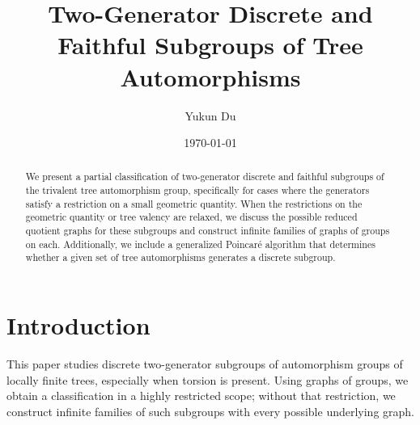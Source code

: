 \documentclass[12pt,leqno]{amsart}
\newcommand{\2}{L^2_{\rm per}(0, T)}
\numberwithin{equation}{section}
\numberwithin{figure}{section}
\begin{document}
\title[Two-Generator Discrete and Faithful Subgroups of Tree Automorphisms]{Two-Generator Discrete and Faithful Subgroups of Tree Automorphisms}


\author{Yukun Du}
\address[Y. Du]{Department of Mathematics, University of Georgia, Athens, GA 30603}


\begin{abstract}
We present a partial classification of two-generator discrete and faithful subgroups of the trivalent tree automorphism group, specifically for cases where the generators satisfy a restriction on a small geometric quantity. When the restrictions on the geometric quantity or tree valency are relaxed, we discuss the possible reduced quotient graphs for these subgroups and construct infinite families of graphs of groups on each. Additionally, we include a generalized Poincar\'e algorithm that determines whether a given set of tree automorphisms generates a discrete subgroup.
\end{abstract}

\date{\today}
\maketitle
\tableofcontents

\section{Introduction}\label{sec:introduction}
This paper studies discrete two-generator subgroups of automorphism groups of locally finite trees, especially when torsion is present. Using graphs of groups, we obtain a classification in a highly restricted scope; without that restriction, we construct infinite families of such subgroups with every possible underlying graph.
\end{document}

